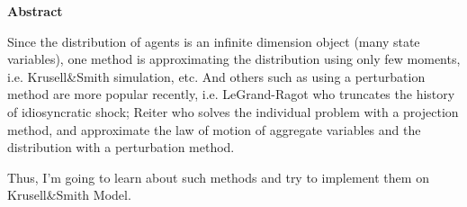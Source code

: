 \vspace{2cm}
\begin{center}
\Large{\bf{Abstract}}
\end{center}
\indent Since the distribution of agents is an infinite dimension object (many state variables), one method is approximating the distribution using only few moments, i.e. Krusell\&Smith simulation, etc. And others such as using a perturbation method are more popular recently, i.e. LeGrand-Ragot who truncates the history of idiosyncratic shock; Reiter who solves the individual problem with a projection method, and approximate the law of motion of aggregate variables and the distribution with a perturbation method.

Thus, I'm going to learn about such methods and try to implement them on Krusell\&Smith Model.